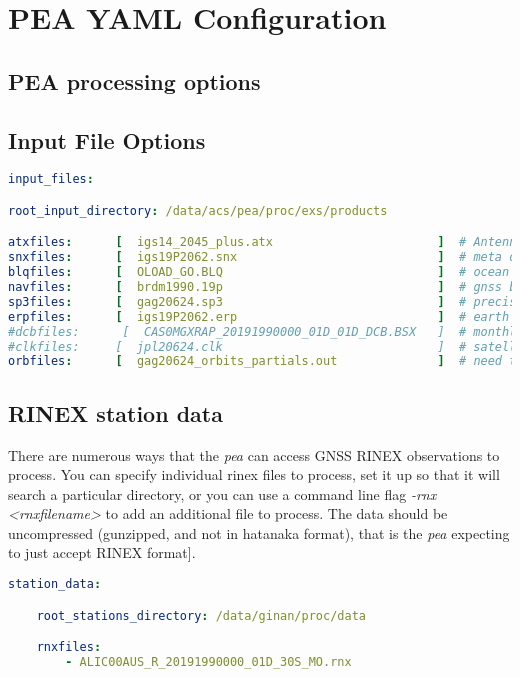 \chapter{PEA YAML Configuration}

\label{ch:pea_yaml_configuration}

\section{PEA processing options}
%
%
\section{Input File Options}
\begin{lstlisting}[language=yaml,caption=yaml input files configuration example]
input_files:

root_input_directory: /data/acs/pea/proc/exs/products

atxfiles:      [  igs14_2045_plus.atx                       ]  # Antenna models
snxfiles:      [  igs19P2062.snx                            ]  # meta data and apriori coords
blqfiles:      [  OLOAD_GO.BLQ                              ]  # ocean loading is applied
navfiles:      [  brdm1990.19p                              ]  # gnss broadcast file
sp3files:      [  gag20624.sp3                              ]  # precise orbit data 
erpfiles:      [  igs19P2062.erp                            ]  # earth orintation parameters
#dcbfiles:      [  CAS0MGXRAP_20191990000_01D_01D_DCB.BSX   ]  # monthly DCB file
#clkfiles:     [  jpl20624.clk                              ]  # satellie and receiver clock 
orbfiles:      [  gag20624_orbits_partials.out              ]  # need this when estimating orbits (overrides .sp3 file)
\end{lstlisting}

\section{RINEX station data}

There are numerous ways that the \emph{pea} can access GNSS RINEX observations to process. You can specify individual rinex files to process, set it up so that it will search a particular directory, or you can use a command line flag \emph{-rnx <rnxfilename>} to add an additional file to process. The data should be uncompressed (gunzipped, and not in hatanaka format), that is the \emph{pea} expecting to just accept RINEX format]. 
%
\begin{lstlisting}[language=yaml,caption=pea yaml processing one station example]
station_data:

	root_stations_directory: /data/ginan/proc/data

	rnxfiles:
		- ALIC00AUS_R_20191990000_01D_30S_MO.rnx                          
\end{lstlisting}\label{lst:pea-yaml-realtime-single-station}

